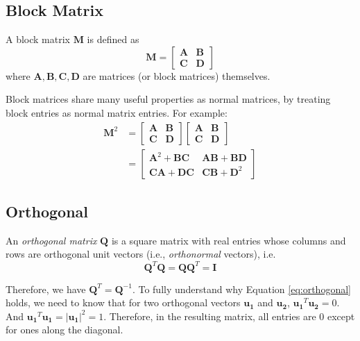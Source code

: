 \subsection{Block Matrix}

\begin{definition}
A block matrix $\bm{M}$ is defined as
\[\bm{M}=\begin{bmatrix}
    \bm{A} & \bm{B}\\
    \bm{C} & \bm{D}
\end{bmatrix}\]
where $\bm{A}, \bm{B}, \bm{C}, \bm{D}$ are matrices (or block matrices) themselves.
\end{definition}
Block matrices share many useful properties as normal matrices, by treating block entries as normal matrix entries. For example:
\begin{align}
    \bm{M}^2 &=\begin{bmatrix}
        \bm{A} & \bm{B}\\
        \bm{C} & \bm{D}
    \end{bmatrix}\begin{bmatrix}
        \bm{A} & \bm{B}\\
        \bm{C} & \bm{D}
    \end{bmatrix}\\
    &=\begin{bmatrix}
        \bm{A}^2+\bm{BC} & \bm{AB}+\bm{BD}\\
        \bm{CA}+\bm{DC} & \bm{CB}+\bm{D}^2
    \end{bmatrix}
\end{align}


\subsection{Orthogonal}
\begin{definition}
An \emph{orthogonal matrix} $\bm{Q}$ is a square matrix with real entries whose columns and rows are orthogonal unit vectors (i.e., \emph{orthonormal} vectors), i.e.
\begin{equation}\label{eq:orthogonal}
    \bm{Q}^T\bm{Q}=\bm{Q}\bm{Q}^T=\bm{I}
\end{equation}
\end{definition}
Therefore, we have $\bm{Q}^T=\bm{Q}^{-1}$. To fully understand why Equation \ref{eq:orthogonal} holds, we need to know that for two orthogonal vectors $\bm{u_1}$ and $\bm{u_2}$, $\bm{u_1}^T\bm{u_2}=0$. And $\bm{u_1}^T\bm{u_1}=|\bm{u_1}|^2=1$. Therefore, in the resulting matrix, all entries are 0 except for ones along the diagonal.

